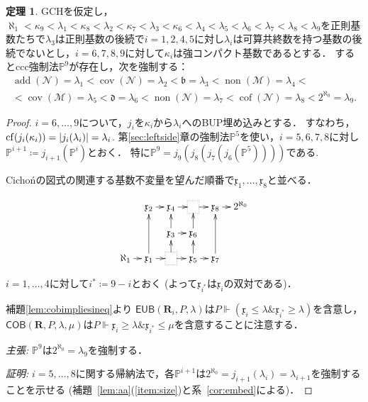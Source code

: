 \documentclass[uplatex,dvipdfmx]{jsarticle}
\newcommand\forces{\Vdash}
\newcommand{\non}{\operatorname{non}}
\newcommand{\cov}{\operatorname{cov}}
\newcommand{\add}{\operatorname{add}}
\newcommand{\cof}{\operatorname{cof}}
\newcommand{\cf}{\operatorname{cf}}
\newcommand{\EUB}{\mathsf{EUB}}
\newcommand{\COB}{\mathsf{COB}}
\newcommand{\relR}{\mathbf{R}}
\newcommand{\Pa}{\mathbb{P}^5}
\newcommand{\Pai}{\mathbb{P}^i}
\newcommand{\Paip}{\mathbb{P}^{i+1}}
\newcommand{\PaIX}{\mathbb{P}^9}
\newcommand{\mye}{*+[F.]{\phantom{\lambda}}}
\newcommand{\covnull}{\cov(\mathcal N)}
\newcommand{\cofnull}{\cof(\mathcal N)}
\newcommand{\addnull}{\add(\mathcal N)}
\newcommand{\nonnull}{\non(\mathcal N)}
\newcommand{\covmeager}{\cov(\mathcal M)}
\newcommand{\nonmeager}{\non(\mathcal M)}
\DeclarePairedDelimiter\abs{\lvert}{\rvert}
\theoremstyle{definition}
\newtheorem{thm}{定理}
\begin{document}
	\begin{thm}
		GCHを仮定し，$\aleph_1<\kappa_9<\lambda_1<\kappa_8<\lambda_2<\kappa_7<\lambda_3<\kappa_6<\lambda_4<\lambda_5<\lambda_6<\lambda_7<\lambda_8<\lambda_9$を正則基数たちで$\lambda_3$は正則基数の後続で$i=1,2,4,5$に対し$\lambda_i$は可算共終数を持つ基数の後続でないとし，$i=6,7,8,9$に対して$\kappa_i$は強コンパクト基数であるとする．
		するとccc強制法$\PaIX$が存在し，次を強制する：
		\begin{multline*} 
			\addnull=\lambda_1 < \covnull =\lambda_2 <\mathfrak{b}=\lambda_3<\nonmeager=\lambda_4<\\ <\covmeager=\lambda_5 < \mathfrak{d}=\lambda_6 < \nonnull=\lambda_7 < \cofnull=\lambda_8< 2^{\aleph_0}=\lambda_9.
		\end{multline*}
	\end{thm}
	\begin{proof}
		$i = 6, \dots, 9$について，$j_i$を$\kappa_i$から$\lambda_i$へのBUP埋め込みとする．
		すなわち，$\cf(j_i(\kappa_i)) = \abs{j_i(\lambda_i)} = \lambda_i$.
		第\ref{sec:leftside}章の強制法$\Pa$を使い，$i=5,6,7,8$に対し$\Paip \coloneq j_{i+1}(\Pai)$とおく．
		特に$\PaIX = j_9(j_8(j_7(j_6(\Pa)))) $である. 		
		
		Cicho\'nの図式の関連する基数不変量を望んだ順番で$\mathfrak x_1,\dots,\mathfrak x_8$と並べる．
		
	
		\[
		\xymatrix@C=8pt@R=12pt{
			& \mathfrak x_2\ar[r]        & \mathfrak x_4 \ar[r]      &  \mye \ar[r]     & \mathfrak x_8\ar[r]  & 2^{\aleph_0} \\
			&                    & \mathfrak x_3\ar[r]\ar[u]  &  \mathfrak x_6\ar[u] &              &\\ 
			\aleph_1\ar[r] & \mathfrak x_1\ar[r]\ar[uu] & \mye\ar[r]\ar[u] &  \mathfrak x_5\ar[r]\ar[u]& \mathfrak x_7\ar[uu] &
		}
		\]   
		
		$i=1,\dots,4$に対して$i^* \coloneq 9-i$とおく (よって$\mathfrak x_{i^*}$は$\mathfrak x_i$の双対である)．
		
		補題\ref{lem:cobimpliesineq}より
		$\EUB(\relR_i, P, \lambda)$は$P \forces (\mathfrak x_i\le \lambda \mathbin{\&} \mathfrak x_{i^*}\ge \lambda)$を含意し，$\COB(\relR, P, \lambda, \mu)$は$P \forces \mathfrak x_i\ge \lambda  \mathbin{\&} \mathfrak x_{i^*}\le \mu$を含意することに注意する．
		
		
		\emph{主張:} $\PaIX$は$2^{\aleph_0}=\lambda_9$を強制する．
		
		\emph{証明:} $i=5,\dots,8$に関する帰納法で，各$\Paip$は$2^{\aleph_0}=j_{i+1}(\lambda_i)=\lambda_{i+1}$を強制することを示せる 
		(補題~\ref{lem:aa}(\ref{item:size})と系~\ref{cor:embed}による)．
		

\end{proof}
\end{document}
